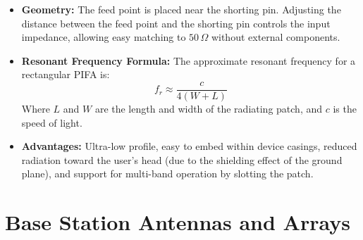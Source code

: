 \documentclass[12pt,a4paper]{article}
\begin{document}
\begin{itemize}[leftmargin=*, itemsep=2.5pt]
  \item \textbf{Geometry:} The feed point is placed near the shorting pin. Adjusting the distance between the feed point and the shorting pin controls the input impedance, allowing easy matching to $50\,\Omega$ without external components.
  \item \textbf{Resonant Frequency Formula:} The approximate resonant frequency for a rectangular PIFA is:
    \begin{equation}
      f_r \approx \frac{c}{4(W + L)}
    \end{equation}
    Where $L$ and $W$ are the length and width of the radiating patch, and $c$ is the speed of light.
  \item \textbf{Advantages:} Ultra-low profile, easy to embed within device casings, reduced radiation toward the user's head (due to the shielding effect of the ground plane), and support for multi-band operation by slotting the patch.
\end{itemize}

\begin{tcolorbox}[tikzbox, title={Planar Inverted-F Antenna (PIFA) Structure}]
\centering
{}
\end{tcolorbox}

\section{Base Station Antennas and Arrays}
\end{document}
